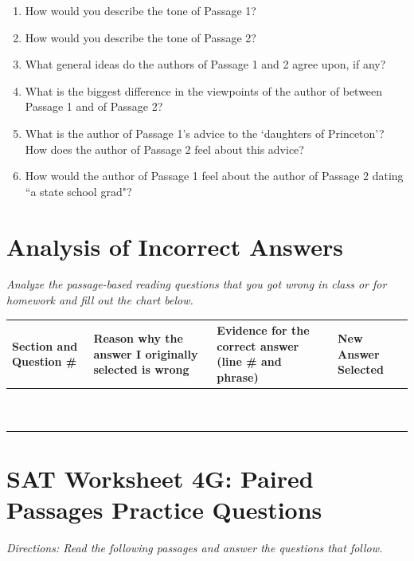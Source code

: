 \documentclass[12pt]{book}
\begin{document}
\begin{enumerate}
\item How would you describe the tone of Passage 1? 
\vfill\item How would you describe the tone of Passage 2?  
\vfill\item What general ideas do the authors of Passage 1 and 2 agree upon, if any?
\vfill\item What is the biggest difference in the viewpoints of the author of between Passage 1 and of Passage 2?
\vfill\item What is the author of Passage 1's advice to the `daughters of Princeton'?  How does the author of Passage 2 feel about this advice?
\vfill\item How would the author of Passage 1 feel about the author of Passage 2 dating ``a state school grad"? 
\end{enumerate}

\vfill
\newpage
\section[Analyzing Incorrect]{Analysis of Incorrect Answers}
\textit{Analyze the passage-based reading questions that you got wrong in class or for homework and fill out the chart below.}

\bigskip
\begin{tabularx}{\textwidth}{|X|p{2in}|p{2in}|X|}\hline
Section and Question \# & Reason why the answer I originally selected is wrong & Evidence for the correct answer (line \# and phrase) & New Answer Selected\\\hline
& & &\\[8ex]\hline
& & &\\[8ex]\hline
& & &\\[8ex]\hline
& & &\\[8ex]\hline
& & &\\[8ex]\hline
& & &\\[8ex]\hline
& & &\\[8ex]\hline
& & &\\[8ex]\hline
& & &\\[8ex]\hline
& & &\\[8ex]\hline
\end{tabularx}

\section[Paired Passages]{SAT Worksheet 4G: Paired Passages Practice Questions}
\textit{Directions: Read the following passages and answer the questions that follow.}
\end{document}
